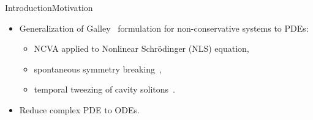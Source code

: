 \begin{frame}[c]{Introduction}{Motivation}
\begin{block}{}
\fontsize{11}{11}\selectfont \begin{itemize}
\item Generalization of Galley~ formulation for non-conservative systems to PDEs:
 \begin{itemize} \item NCVA applied to Nonlinear Schr\"{o}dinger (NLS) equation,
	\item spontaneous symmetry breaking~,
	\item temporal tweezing of cavity solitons~.
	\end{itemize}
\item Reduce complex PDE to ODEs.
\end{itemize}
\end{block}
\end{frame}


